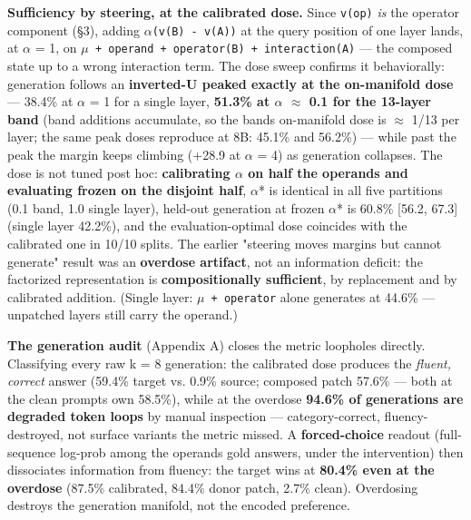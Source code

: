 \textbf{Sufficiency by steering, at the calibrated dose.} Since
\texttt{v(op)} \emph{is} the operator component (\S{}3), adding
\texttt{\ensuremath{\alpha}\textperiodcentered{}(v(B)\ -\ v(A))} at the query position of one layer lands, at
\ensuremath{\alpha} = 1, on \texttt{\ensuremath{\mu}\ +\ operand\ +\ operator(B)\ +\ interaction(A)} ---
the composed state up to a wrong interaction term. The dose sweep
confirms it behaviorally: generation follows an \textbf{inverted-U
peaked exactly at the on-manifold dose} --- 38.4\% at \ensuremath{\alpha} = 1 for a single
layer, \textbf{51.3\% at \ensuremath{\alpha} \ensuremath{\approx} 0.1 for the 13-layer band} (band additions
accumulate, so the band\textquotesingle s on-manifold dose is \ensuremath{\approx} 1/13 per
layer; the same peak doses reproduce at 8B: 45.1\% and 56.2\%) --- while
past the peak the margin keeps climbing (+28.9 at \ensuremath{\alpha} = 4) as generation
collapses. The dose is not tuned post hoc: \textbf{calibrating \ensuremath{\alpha} on half
the operands and evaluating frozen on the disjoint half}, \ensuremath{\alpha}* is
identical in all five partitions (0.1 band, 1.0 single layer), held-out
generation at frozen \ensuremath{\alpha}* is 60.8\% {[}56.2, 67.3{]} (single layer
42.2\%), and the evaluation-optimal dose coincides with the calibrated
one in 10/10 splits. The earlier "steering moves margins but cannot
generate" result was an \textbf{overdose artifact}, not an information
deficit: the factorized representation is \textbf{compositionally
sufficient}, by replacement and by calibrated addition. (Single layer:
\texttt{\ensuremath{\mu}\ +\ operator} alone generates at 44.6\% --- unpatched layers
still carry the operand.)

\textbf{The generation audit} (Appendix A) closes the metric loopholes
directly. Classifying every raw k = 8 generation: the calibrated dose
produces the \emph{fluent, correct} answer (59.4\% target vs. 0.9\%
source; composed patch 57.6\% --- both at the clean
prompt\textquotesingle s own 58.5\%), while at the overdose
\textbf{94.6\% of generations are degraded token loops} by manual
inspection --- category-correct, fluency-destroyed, not surface variants
the metric missed. A \textbf{forced-choice} readout (full-sequence
log-prob among the operand\textquotesingle s gold answers, under the
intervention) then dissociates information from fluency: the target wins
at \textbf{80.4\% even at the overdose} (87.5\% calibrated, 84.4\% donor
patch, 2.7\% clean). Overdosing destroys the generation manifold, not
the encoded preference.

